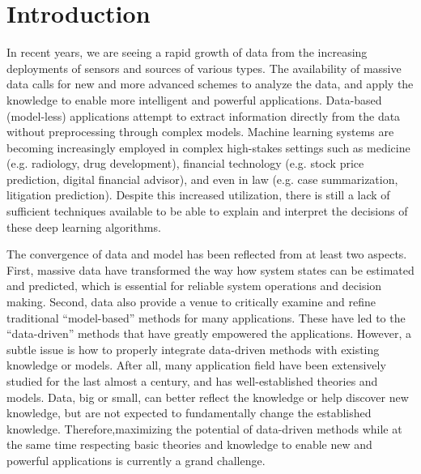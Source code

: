 \section{Introduction}

In recent years, we are seeing a rapid growth of data from the increasing deployments of sensors and sources of various types. The availability of massive data calls for new and more advanced schemes to analyze the data, and apply the knowledge to  enable more intelligent and powerful applications.  Data-based (model-less) applications attempt to extract information directly from the data without preprocessing through complex models. Machine learning systems are becoming increasingly employed in complex high-stakes settings such as medicine (e.g. radiology, drug development), financial technology (e.g. stock price prediction, digital financial advisor), and even in law (e.g. case summarization, litigation prediction). Despite this increased utilization, there is still a lack of sufficient techniques available to be able to explain and interpret the decisions of these deep learning algorithms.

The convergence of data and model has been reflected from at least two aspects. First, massive data have transformed the way how system states can be estimated and predicted, which is essential for reliable system operations and decision making. Second, data also provide a venue to critically examine and refine traditional “model-based” methods for many applications. These have led to the “data-driven” methods that have greatly empowered the applications. However, a subtle issue is how to properly integrate data-driven methods with existing knowledge or models. After all, many application field have been extensively studied for the last almost a century, and has well-established theories and models. Data, big or small, can better reflect the knowledge or help discover new knowledge, but are not expected to fundamentally change the established knowledge. Therefore,maximizing the potential of data-driven methods while at the same time respecting basic theories and knowledge to enable new and powerful applications is currently a grand challenge.

